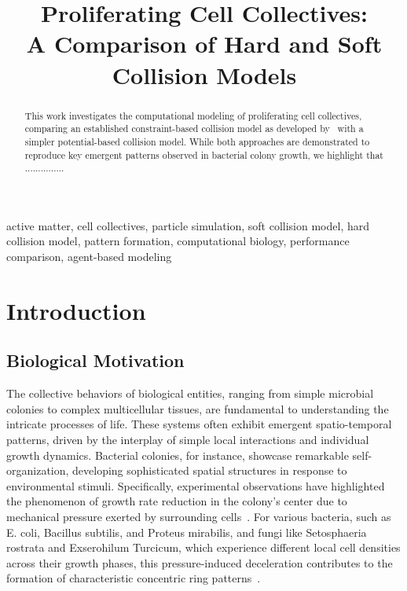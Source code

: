 \documentclass[conference]{IEEEtran}
\begin{document}
\title{Proliferating Cell Collectives: \\A Comparison of Hard and Soft Collision Models}

\author{
}

\maketitle

\begin{abstract}
    This work investigates the computational modeling of proliferating cell collectives, comparing an established constraint-based collision model as developed by~\cite{Weady2024} with a simpler potential-based collision model. While both approaches are demonstrated to reproduce key emergent patterns observed in bacterial colony growth, we highlight that ...............

\end{abstract}

\begin{IEEEkeywords}
    active matter, cell collectives, particle simulation, soft collision model, hard collision model, pattern formation, computational biology, performance comparison, agent-based modeling
\end{IEEEkeywords}

\section{Introduction}
\subsection{Biological Motivation}

The collective behaviors of biological entities, ranging from simple microbial colonies to complex multicellular tissues, are fundamental to understanding the intricate processes of life. These systems often exhibit emergent spatio-temporal patterns, driven by the interplay of simple local interactions and individual growth dynamics. Bacterial colonies, for instance, showcase remarkable self-organization, developing sophisticated spatial structures in response to environmental stimuli. Specifically, experimental observations have highlighted the phenomenon of growth rate reduction in the colony's center due to mechanical pressure exerted by surrounding cells~\cite{Wittmann2023}. For various bacteria, such as E. coli, Bacillus subtilis, and Proteus mirabilis, and fungi like Setosphaeria rostrata and Exserohilum Turcicum, which experience different local cell densities across their growth phases, this pressure-induced deceleration contributes to the formation of characteristic concentric ring patterns~\cite{YAMAZAKI2005136}.
\end{document}
